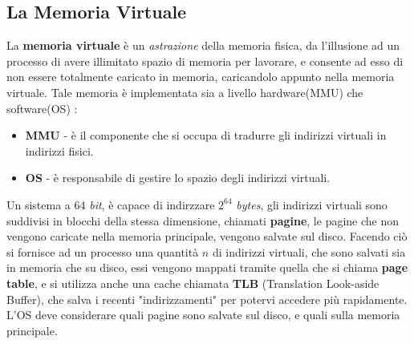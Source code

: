 \documentclass[12pt, letterpaper]{article}
\begin{document}
\subsection{La Memoria Virtuale}
La \textbf{memoria virtuale} è un \textit{astrazione} della memoria fisica, da l'illusione ad un processo di 
avere illimitato spazio di memoria per lavorare, e consente ad esso di non essere totalmente caricato 
in memoria, caricandolo appunto nella memoria virtuale. Tale memoria è implementata sia a livello 
hardware(MMU) che software(OS) :
\begin{itemize}
    \item \textbf{MMU} - è il componente che si occupa di tradurre gli indirizzi virtuali in indirizzi fisici.
    \item \textbf{OS} - è responsabile di gestire lo spazio degli indirizzi virtuali.
\end{itemize}
Un sistema a 64 \textit{bit}, è capace di indirzzare \(2^{64}\) \textit{bytes}, gli indirizzi virtuali sono 
suddivisi in blocchi della stessa dimensione, chiamati \textbf{pagine}, le pagine che non vengono caricate 
nella memoria principale, vengono salvate sul disco. Facendo ciò si fornisce ad un processo una quantità \(n\) di 
indirizzi virtuali, che sono salvati sia in memoria che su disco, essi vengono mappati tramite quella che si chiama 
\textbf{page table}, e si utilizza anche una cache chiamata \textbf{TLB} (Translation Look-aside Buffer), che salva 
i recenti "indirizzamenti" per potervi accedere più rapidamente. L'OS deve considerare quali pagine sono 
salvate sul disco, e quali sulla memoria principale.
\end{document}
